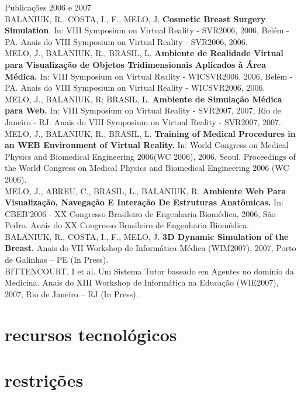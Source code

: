 Publicações 2006 e 2007\\
BALANIUK, R., COSTA, I., F., MELO, J. \textbf{Cosmetic Breast Surgery Simulation}. In: VIII
Symposium on Virtual Reality - SVR2006, 2006, Belém - PA. Anais do VIII Symposium on
Virtual Reality - SVR2006, 2006.\\
MELO, J., BALANIUK, R., BRASIL, L. \textbf{Ambiente de Realidade Virtual para Visualização de
Objetos Tridimensionais Aplicados à Área Médica.} In: VIII Symposium on Virtual Reality -
WICSVR2006, 2006, Belém - PA. Anais do VIII Symposium on Virtual Reality - WICSVR2006,
2006.\\
MELO, J., BALANIUK, R; BRASIL, L. \textbf{Ambiente de Simulação Médica para Web.} In: VIII
Symposium on Virtual Reality - SVR2007, 2007, Rio de Janeiro - RJ. Anais do VIII Symposium
on Virtual Reality - SVR2007, 2007.\\
MELO, J., BALANIUK, R., BRASIL, L. \textbf{Training of Medical Procedures in an WEB
Environment of Virtual Reality.} In: World Congress on Medical Physics and Biomedical
Engineering 2006(WC 2006), 2006, Seoul. Proceedings of the World Congress on Medical Physics
and Biomedical Engineering 2006 (WC 2006).\\
MELO, J., ABREU, C., BRASIL, L., BALANIUK, R. \textbf{Ambiente Web Para Visualização,
Navegação E Interação De Estruturas Anatômicas.} In: CBEB'2006 - XX Congresso Brasileiro
de Engenharia Biomédica, 2006, São Pedro. Anais do XX Congresso Brasileiro de Engenharia
Biomédica.\\
BALANIUK, R., COSTA, I., F., MELO, J. \textbf{3D Dynamic Simulation of the Breast.} Anais do VII
Workshop de Informática Médica (WIM2007), 2007, Porto de Galinhas – PE (In Press).\\
BITTENCOURT, I et al. Um Sistema Tutor baseado em Agentes no domínio da Medicina.
Anais do XIII Workshop de Informática na Educação (WIE2007), 2007, Rio de Janeiro – RJ (In
Press).


\section[RECURSOS TECNOLÓGICOS]{recursos tecnológicos}

\section[RESTRIÇÕES]{restrições}

